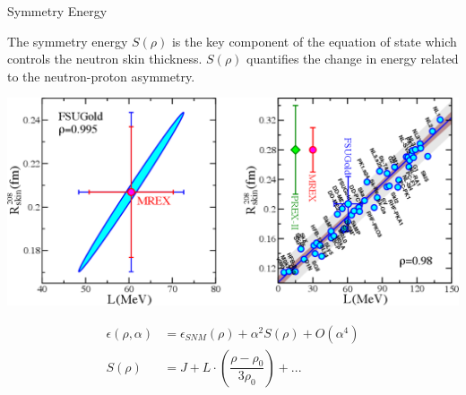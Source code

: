 \documentclass[9pt,a4paper]{beamer}
\begin{document}
\begin{frame}{Symmetry Energy}

The symmetry energy $S(\rho)$ is the key component of the equation of state which controls the neutron skin thickness. $S(\rho)$ quantifies the change in energy related to the neutron-proton asymmetry. 

\begin{center}
\includegraphics[scale=0.3]{figures/LvsR.pdf}
\end{center}

\begin{equation}
\begin{split}
\epsilon(\rho, \alpha) &= \epsilon_{SNM}(\rho) + \alpha^{2} S(\rho) + O(\alpha^{4}) \\
S(\rho) &= J + L \cdot (\dfrac{\rho - \rho_{0}}{3 \rho_{0}}) + ...
\end{split}
\end{equation} 

\end{frame}
\end{document}
